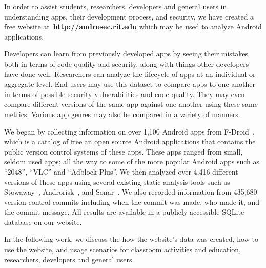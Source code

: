 \documentclass[journal,transmag]{IEEEtran}
\begin{document}

%


 In order to assist students, researchers, developers and general users in understanding apps, their development process, and security, we have created a free website at~\textbf{\url{http://androsec.rit.edu}} which may be used to analyze Android applications.

Developers can learn from previously developed apps by seeing their mistakes both in terms of code quality and security, along with things other developers have done well. Researchers can analyze the lifecycle of apps at an individual or aggregate level. End users may use this dataset to compare apps to one another in terms of possible security vulnerabilities and code quality. They may even compare different versions of the same app against one another using these same metrics. Various app genres may also be compared in a variety of manners.

We began by collecting information on over 1,100 Android apps from F-Droid~\cite{fdroid_url}, which is a catalog of free an open source Android applications that contains the public version control systems of these apps. These apps ranged from small, seldom used apps; all the way to some of the more popular Android apps such as ``2048'', ``VLC''  and ``Adblock Plus''. We then analyzed over 4,416 different versions of these apps using several  existing static analysis tools such as Stowaway~\cite{Felt:2011:APD:2046707.2046779}, Androrisk~\cite{androguard_url}, and Sonar~\cite{sonar_qube_url}. We also recorded information from 435,680 version control commits including when the commit was made, who made it, and the commit message. All results are available in a publicly accessible SQLite database on our website.


In the following work, we discuss the how the website's data was created, how to use the website, and usage scenarios for classroom activities and education, researchers, developers and general users.



\end{document}
